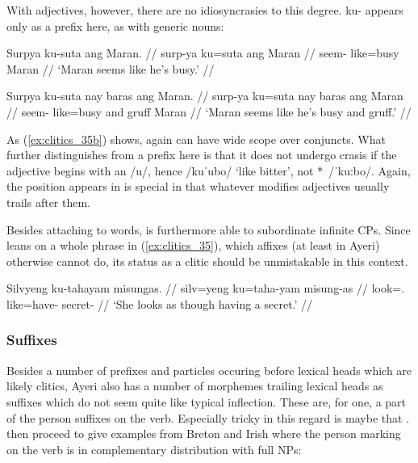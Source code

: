 With adjectives, however, there are no idiosyncrasies to this degree.
 {ku-} appears only as a prefix here, as with generic nouns:

\pex\label{ex:clitics_35}
\a\label{ex:clitics_35a}\begingl
	\gla Surpya ku-suta ang Maran. //
	\glb surp-ya ku=suta ang Maran //
	\glc seem-\TsgM{} like=busy \Aarg{} Maran //
	\glft `Maran seems like he's busy.' //
\endgl

\a\label{ex:clitics_35b}\begingl
	\gla Surpya ku-suta nay baras ang Maran. //
	\glb surp-ya ku=suta nay baras ang Maran //
	\glc seem-\TsgM{} like=busy and gruff \Aarg{} Maran //
	\glft `Maran seems like he's busy and gruff.' //
\endgl
\xe

As (\ref{ex:clitics_35b}) shows,  again can have wide scope over
conjuncts. What further distinguishes  from a prefix here is
that it does not undergo crasis if the adjective begins with an /u/, hence
 /kuˈubo/ `like bitter', not *\,
/ˈkuːbo/. Again, the position  appears in is special in that
whatever modifies adjectives usually trails after them.

Besides attaching to words,  is furthermore able to subordinate
infinite CPs. Since  leans on a whole phrase in 
(\ref{ex:clitics_35}), which affixes (at least in Ayeri) otherwise cannot do,
its status as a clitic should be unmistakable in this context.

\ex\label{ex:clitics_36}\begingl
	\gla Silvyeng ku-tahayam misungas. //
	\glb silv=yeng ku=taha-yam misung-as //
	\glc look=\TsgF{}.\Aarg{} like=have-\Ptcp{} secret-\Parg{} //
	\glft `She looks as though having a secret.' //
\endgl\xe

\subsubsection{Suffixes}
\label{subsubsec:suffixes}

Besides a number of prefixes and particles occuring before lexical heads which
are likely clitics, Ayeri also has a number of morphemes trailing lexical heads
as suffixes which do not seem quite like typical inflection. These are, for
one, a part of the person suffixes on the verb. Especially tricky in this
regard is maybe that  \parencites[144]{spencerluis2012}[also
compare][101]{corbett2006}. \citet{spencerluis2012} then proceed to give
examples from Breton and Irish where the person marking on the verb is in
complementary distribution with full NPs:

